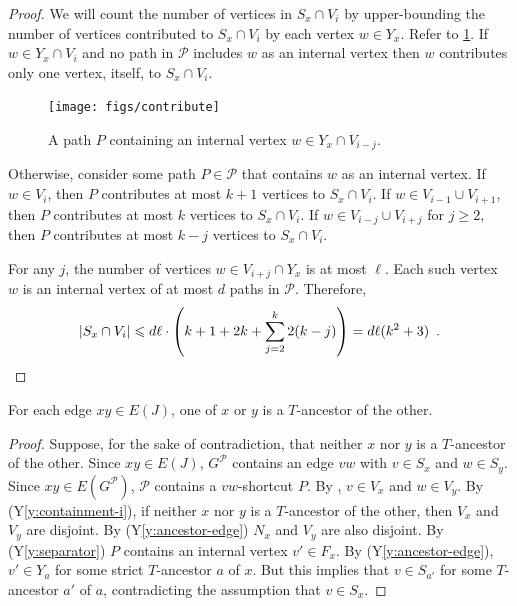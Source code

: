\documentclass{patmorin}
\newcommand{\yref}[1]{(Y\ref{y:#1})}
\renewcommand{\ge}{\geqslant}
\renewcommand{\le}{\leqslant}
\begin{document}
\begin{proof}
  We will count the number of vertices in $S_x\cap V_i$ by upper-bounding the number of vertices contributed to $S_x\cap V_i$ by each vertex $w\in Y_x$. Refer to \cref{contribute}.
  If $w\in Y_x\cap V_i$ and no path in $\mathcal{P}$ includes $w$ as an internal vertex then $w$ contributes only one vertex, itself, to $S_x\cap V_i$.
  \begin{figure}
    \begin{center}
      \texttt{[image: figs/contribute]}
    \end{center}
    \caption{A path $P$ containing an internal vertex $w\in Y_x\cap V_{i-j}$.}
    \label{contribute}
  \end{figure}

  Otherwise, consider some path $P\in\mathcal{P}$ that contains $w$ as an internal vertex.  If $w\in V_{i}$, then $P$ contributes at most $k+1$ vertices to $S_x\cap V_i$.  If $w\in V_{i-1}\cup V_{i+1}$, then $P$ contributes at most $k$ vertices to $S_x\cap V_i$. If $w\in V_{i-j}\cup V_{i+j}$ for $j\ge 2$, then $P$ contributes at most $k-j$ vertices to $S_x\cap V_i$.
  
  For any $j$, the number of vertices $w\in V_{i+j}\cap Y_x$ is at most $\ell$. Each such vertex $w$ is an internal vertex of at most $d$ paths in $\mathcal{P}$. Therefore, 
  \[  |S_x\cap V_i|\le d\ell\cdot\left(k+1 + 2k + \sum_{j=2}^k 2(k-j)\right) %
      = d\ell(k^2 +3) \enspace . \qedhere
  \]
\end{proof}

\begin{clm}
  For each edge $xy\in E(J)$, one of $x$ or $y$ is a $T$-ancestor of the other.
\end{clm}

\begin{proof}
  Suppose, for the sake of contradiction, that neither $x$ nor $y$ is a $T$-ancestor of the other.  Since $xy\in E(J)$, $G^\mathcal{P}$ contains an edge $vw$ with $v\in S_x$ and $w\in S_y$.  Since $xy\in E(G^{\mathcal{P}})$,  $\mathcal{P}$ contains a $vw$-shortcut $P$.  By , $v\in V_x$ and $w\in V_y$.  By \yref{containment-i}, if neither $x$ nor $y$ is a $T$-ancestor of the other, then $V_x$ and $V_y$ are disjoint.  By \yref{ancestor-edge} $N_x$ and $V_y$ are also disjoint.  By \yref{separator} $P$ contains an internal vertex $v'\in F_x$.  By \yref{ancestor-edge}, $v'\in Y_a$ for some strict $T$-ancestor $a$ of $x$.  But this implies that $v\in S_{a'}$ for some $T$-ancestor $a'$ of $a$, contradicting the assumption that $v\in S_x$.
\end{proof}
\end{document}
